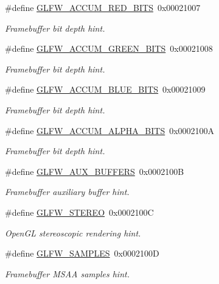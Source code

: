 \begin{DoxyCompactItemize}
\#define \mbox{\hyperlink{group__window_gaead34a9a683b2bc20eecf30ba738bfc6}{G\+L\+F\+W\+\_\+\+A\+C\+C\+U\+M\+\_\+\+R\+E\+D\+\_\+\+B\+I\+TS}}~0x00021007
\begin{DoxyCompactList}\small\item\em Framebuffer bit depth hint. \end{DoxyCompactList}\item 
\#define \mbox{\hyperlink{group__window_ga65713cee1326f8e9d806fdf93187b471}{G\+L\+F\+W\+\_\+\+A\+C\+C\+U\+M\+\_\+\+G\+R\+E\+E\+N\+\_\+\+B\+I\+TS}}~0x00021008
\begin{DoxyCompactList}\small\item\em Framebuffer bit depth hint. \end{DoxyCompactList}\item 
\#define \mbox{\hyperlink{group__window_ga22bbe9104a8ce1f8b88fb4f186aa36ce}{G\+L\+F\+W\+\_\+\+A\+C\+C\+U\+M\+\_\+\+B\+L\+U\+E\+\_\+\+B\+I\+TS}}~0x00021009
\begin{DoxyCompactList}\small\item\em Framebuffer bit depth hint. \end{DoxyCompactList}\item 
\#define \mbox{\hyperlink{group__window_gae829b55591c18169a40ab4067a041b1f}{G\+L\+F\+W\+\_\+\+A\+C\+C\+U\+M\+\_\+\+A\+L\+P\+H\+A\+\_\+\+B\+I\+TS}}~0x0002100A
\begin{DoxyCompactList}\small\item\em Framebuffer bit depth hint. \end{DoxyCompactList}\item 
\#define \mbox{\hyperlink{group__window_gab05108c5029443b371112b031d1fa174}{G\+L\+F\+W\+\_\+\+A\+U\+X\+\_\+\+B\+U\+F\+F\+E\+RS}}~0x0002100B
\begin{DoxyCompactList}\small\item\em Framebuffer auxiliary buffer hint. \end{DoxyCompactList}\item 
\#define \mbox{\hyperlink{group__window_ga83d991efca02537e2d69969135b77b03}{G\+L\+F\+W\+\_\+\+S\+T\+E\+R\+EO}}~0x0002100C
\begin{DoxyCompactList}\small\item\em Open\+GL stereoscopic rendering hint. \end{DoxyCompactList}\item 
\#define \mbox{\hyperlink{group__window_ga2cdf86fdcb7722fb8829c4e201607535}{G\+L\+F\+W\+\_\+\+S\+A\+M\+P\+L\+ES}}~0x0002100D
\begin{DoxyCompactList}\small\item\em Framebuffer M\+S\+AA samples hint. \end{DoxyCompactList}\item 

\end{DoxyCompactItemize}
